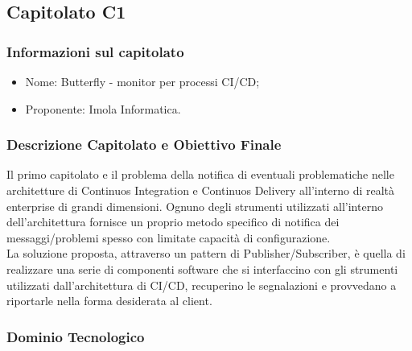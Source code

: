 \subsection{Capitolato C1}

\subsubsection{Informazioni sul capitolato}
\begin{itemize}
	\item Nome: Butterfly - monitor per processi CI/CD;
	\item Proponente: Imola Informatica.
\end{itemize}

\subsubsection{Descrizione Capitolato e Obiettivo Finale}
Il primo capitolato e il problema della notifica di eventuali problematiche nelle architetture di Continuos Integration e Continuos Delivery all'interno di realtà enterprise di grandi dimensioni. Ognuno degli strumenti utilizzati all'interno dell'architettura fornisce un proprio metodo specifico di notifica dei messaggi/problemi spesso con limitate capacità di configurazione. \\
La soluzione proposta, attraverso un pattern di Publisher/Subscriber, è quella di realizzare una serie di componenti software che si interfaccino con gli strumenti utilizzati dall'architettura di CI/CD, recuperino  le segnalazioni e provvedano a riportarle nella forma desiderata al client.  
\subsubsection{Dominio Tecnologico}

